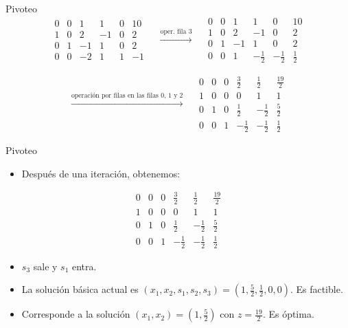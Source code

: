 \documentclass{beamer}
\begin{document}
\begin{frame}{Pivoteo}
    \[
    \begin{array}{ccccc|c}
        0 & 0 & 1 & 1 & 0 & 10 \\
        \hline
        1 & 0 & 2 & -1 & 0 & 2 \\
        0 & 1 & -1 & 1 & 0 & 2 \\
        0 & 0 & -2 & 1 & 1 & -1
    \end{array}
    \quad \xrightarrow{\text{oper. fila 3}} \quad
    \begin{array}{ccccc|c}
        0 & 0 & 1 & 1 & 0 & 10 \\
        \hline
        1 & 0 & 2 & -1 & 0 & 2 \\
        0 & 1 & -1 & 1 & 0 & 2 \\
        0 & 0 & 1 & -\frac{1}{2} & -\frac{1}{2} & \frac{1}{2}
    \end{array}
    \]

    \vspace{0.5cm}

    \[
    \xrightarrow{\text{operación por filas en las filas 0, 1 y 2}} \quad
    \begin{array}{ccccc|c}
        0 & 0 & 0 & \frac{3}{2} & \frac{1}{2} & \frac{19}{2} \\
        \hline
        1 & 0 & 0 & 0 & 1 & 1 \\
        0 & 1 & 0 & \frac{1}{2} & -\frac{1}{2} & \frac{5}{2} \\
        0 & 0 & 1 & -\frac{1}{2} & -\frac{1}{2} & \frac{1}{2}
    \end{array}
    \]
\end{frame}

\begin{frame}{Pivoteo}
    \begin{itemize}
        \item Después de una iteración, obtenemos:
    \end{itemize}

    \[
    \begin{array}{ccccc|c}
        0 & 0 & 0 & \frac{3}{2} & \frac{1}{2} & \frac{19}{2} \\
        \hline
        1 & 0 & 0 & 0 & 1 & 1 \\
        0 & 1 & 0 & \frac{1}{2} & -\frac{1}{2} & \frac{5}{2} \\
        0 & 0 & 1 & -\frac{1}{2} & -\frac{1}{2} & \frac{1}{2}
    \end{array}
    \]

    \begin{itemize}
        \item \( s_3 \) sale y \( s_1 \) entra.
        \item La solución básica actual es \( (x_1, x_2, s_1, s_2, s_3) = \left(1, \frac{5}{2}, \frac{1}{2}, 0, 0\right) \). Es factible.
        \item Corresponde a la solución \( (x_1, x_2) = \left(1, \frac{5}{2}\right) \) con \( z = \frac{19}{2} \). Es óptima.
    \end{itemize}
\end{frame}
\end{document}
